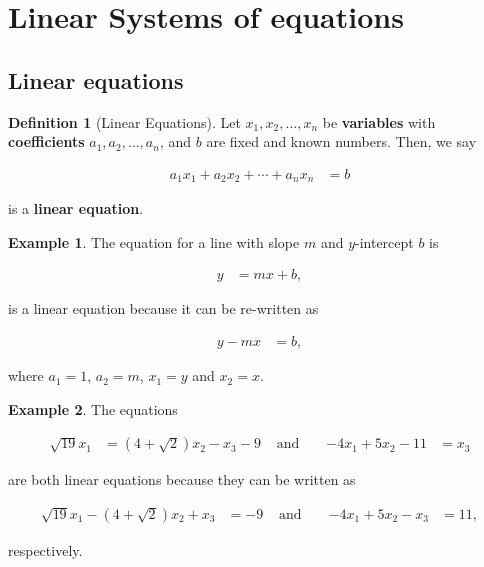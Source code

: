\documentclass[
]{book}
\theoremstyle{definition}
\newtheorem{definition}{Definition}[chapter]
\theoremstyle{definition}
\newtheorem{example}{Example}[chapter]
\theoremstyle{definition}
\theoremstyle{definition}
\theoremstyle{remark}
\begin{document}
\hypertarget{linear-systems-of-equations-1}{%
\section{Linear Systems of equations}\label{linear-systems-of-equations-1}}

\hypertarget{linear-equations}{%
\subsection{Linear equations}\label{linear-equations}}

\begin{definition}[Linear Equations]
Let \(x_1, x_2, \ldots, x_n\) be \textbf{variables} with \textbf{coefficients} \(a_1, a_2, \ldots, a_n\), and \(b\) are fixed and known numbers. Then, we say

\[
\begin{aligned}
a_1 x_1 + a_2 x_2 + \cdots + a_n x_n & = b
\end{aligned}
\label{eq:linear}
\]

is a \textbf{linear equation}.
\end{definition}

\begin{example}
The equation for a line with slope \(m\) and \(y\)-intercept \(b\) is

\[
\begin{aligned}
y & = m x + b,
\end{aligned}
\]

is a linear equation because it can be re-written as

\[
\begin{aligned}
y - m x & = b,
\end{aligned}
\]

where \(a_1 = 1\), \(a_2 = m\), \(x_1 = y\) and \(x_2 = x\).
\end{example}

\begin{example}
The equations

\[
\begin{aligned}
\sqrt{19} x_1 & = (4 + \sqrt{2}) x_2 - x_3 - 9
& \mbox{ and } && 
-4 x_1 + 5 x_2 - 11 & = x_3
\end{aligned}
\]

are both linear equations because they can be written as

\[
\begin{aligned}
\sqrt{19} x_1 - (4 + \sqrt{2}) x_2 + x_3 & = - 9 
& \mbox{ and } &&
-4 x_1 + 5 x_2 - x_3 & = 11,
\end{aligned}
\]

respectively.
\end{example}
\end{document}
